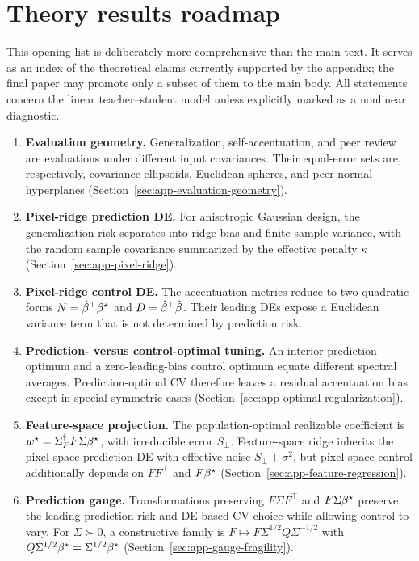 \section{Theory results roadmap}
\label{sec:app-theory-roadmap}
\begingroup\color{red}
This opening list is deliberately more comprehensive than the main text.  It
serves as an index of the theoretical claims currently supported by the
appendix; the final paper may promote only a subset of them to the main body.
All statements concern the linear teacher--student model unless explicitly
marked as a nonlinear diagnostic.

\begin{enumerate}
\item \textbf{Evaluation geometry.} Generalization, self-accentuation, and
peer review are evaluations under different input covariances. Their equal-error
sets are, respectively, covariance ellipsoids, Euclidean spheres, and
peer-normal hyperplanes (Section~\ref{sec:app-evaluation-geometry}).

\item \textbf{Pixel-ridge prediction DE.} For anisotropic Gaussian design,
the generalization risk separates into ridge bias and finite-sample variance,
with the random sample covariance summarized by the effective penalty
$\kappa$ (Section~\ref{sec:app-pixel-ridge}).

\item \textbf{Pixel-ridge control DE.} The accentuation metrics reduce to two
quadratic forms $N=\hat{\beta}^\top{\beta^{\star}}$ and $D=\hat{\beta}^\top\hat{\beta}$.  Their leading
DEs expose a Euclidean variance term that is not determined by prediction risk.

\item \textbf{Prediction- versus control-optimal tuning.} An interior
prediction optimum and a zero-leading-bias control optimum equate different
spectral averages.  Prediction-optimal CV therefore leaves a residual
accentuation bias except in special symmetric cases
(Section~\ref{sec:app-optimal-regularization}).

\item \textbf{Feature-space projection.} The population-optimal realizable
coefficient is $w^\star=\Sigma_F^\dagger F\Sigma{\beta^{\star}}$, with irreducible
error $S_\perp$.  Feature-space ridge inherits the pixel-space prediction DE
with effective noise $S_\perp+\sigma^2$, but pixel-space control additionally
depends on $FF^\top$ and $F{\beta^{\star}}$
(Section~\ref{sec:app-feature-regression}).

\item \textbf{Prediction gauge.} Transformations preserving
$F\Sigma F^\top$ and $F\Sigma{\beta^{\star}}$ preserve the leading prediction risk and
DE-based CV choice while allowing control to vary.  For $\Sigma\succ0$, a
constructive family is $F\mapsto F\Sigma^{1/2}Q\Sigma^{-1/2}$ with
$Q\Sigma^{1/2}{\beta^{\star}}=\Sigma^{1/2}{\beta^{\star}}$
(Section~\ref{sec:app-gauge-fragility}).


\end{enumerate}
